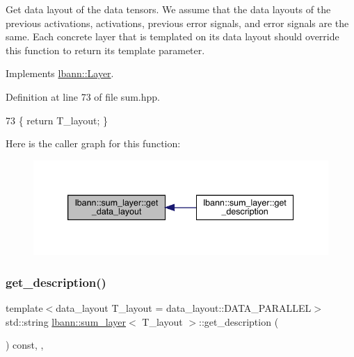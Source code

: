Get data layout of the data tensors. We assume that the data layouts of the previous activations, activations, previous error signals, and error signals are the same. Each concrete layer that is templated on its data layout should override this function to return its template parameter. 

Implements \hyperlink{classlbann_1_1Layer_a5dfb66e81fc085997402a5e2241316bd}{lbann\+::\+Layer}.



Definition at line 73 of file sum.\+hpp.


\begin{DoxyCode}
73 \{ \textcolor{keywordflow}{return} T\_layout; \}
\end{DoxyCode}
Here is the caller graph for this function\+:\nopagebreak
\begin{figure}[H]
\begin{center}
\leavevmode
\includegraphics[width=339pt]{classlbann_1_1sum__layer_a6c71a7d29f6e36b2a1f588a2545c769e_icgraph}
\end{center}
\end{figure}
\mbox{\label{classlbann_1_1sum__layer_a73e45687c97990d88a2e31dc177ef56e}} 
\subsubsection{\texorpdfstring{get\+\_\+description()}{get\_description()}}
{\footnotesize\ttfamily template$<$data\+\_\+layout T\+\_\+layout = data\+\_\+layout\+::\+D\+A\+T\+A\+\_\+\+P\+A\+R\+A\+L\+L\+EL$>$ \\
std\+::string \hyperlink{classlbann_1_1sum__layer}{lbann\+::sum\+\_\+layer}$<$ T\+\_\+layout $>$\+::get\+\_\+description (\begin{DoxyParamCaption}{ }\end{DoxyParamCaption}) const\hspace{0.3cm}{\ttfamily [inline]}, {\ttfamily [override]}, {\ttfamily [virtual]}}

